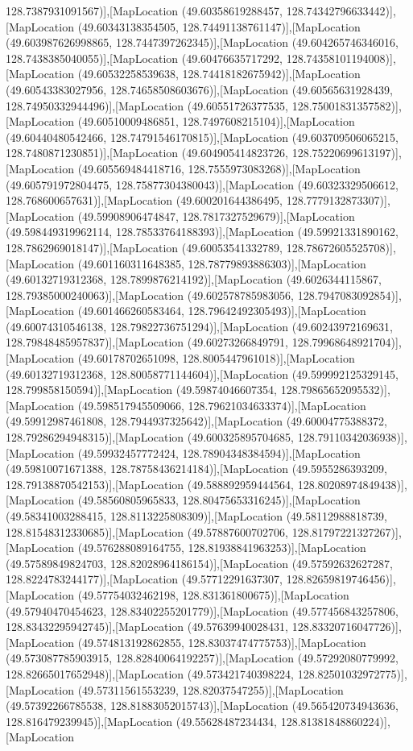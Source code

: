 128.7387931091567)],[MapLocation (49.60358619288457, 128.74342796633442)],[MapLocation (49.60343138354505, 128.74491138761147)],[MapLocation (49.603987626998865, 128.7447397262345)],[MapLocation (49.604265746346016, 128.7438385040055)],[MapLocation (49.60476635717292, 128.74358101194008)],[MapLocation (49.60532258539638, 128.74418182675942)],[MapLocation (49.60543383027956, 128.74658508603676)],[MapLocation (49.60565631928439, 128.74950332944496)],[MapLocation (49.60551726377535, 128.75001831357582)],[MapLocation (49.60510009486851, 128.7497608215104)],[MapLocation (49.60440480542466, 128.74791546170815)],[MapLocation (49.603709506065215, 128.7480871230851)],[MapLocation (49.604905414823726, 128.75220699613197)],[MapLocation (49.605569484418716, 128.7555973083268)],[MapLocation (49.605791972804475, 128.75877304380043)],[MapLocation (49.60323329506612, 128.768600657631)],[MapLocation (49.600201644386495, 128.7779132873307)],[MapLocation (49.59908906474847, 128.7817327529679)],[MapLocation (49.598449319962114, 128.78533764188393)],[MapLocation (49.59921331890162, 128.7862969018147)],[MapLocation (49.60053541332789, 128.78672605525708)],[MapLocation (49.601160311648385, 128.78779893886303)],[MapLocation (49.60132719312368, 128.7899876214192)],[MapLocation (49.6026344115867, 128.79385000240063)],[MapLocation (49.602578785983056, 128.7947083092854)],[MapLocation (49.601466260583464, 128.79642492305493)],[MapLocation (49.60074310546138, 128.79822736751294)],[MapLocation (49.60243972169631, 128.79848485957837)],[MapLocation (49.60273266849791, 128.79968648921704)],[MapLocation (49.60178702651098, 128.8005447961018)],[MapLocation (49.60132719312368, 128.80058771144604)],[MapLocation (49.599992125329145, 128.799858150594)],[MapLocation (49.59874046607354, 128.79865652095532)],[MapLocation (49.598517945509066, 128.79621034633374)],[MapLocation (49.59912987461808, 128.7944937325642)],[MapLocation (49.60004775388372, 128.79286294948315)],[MapLocation (49.600325895704685, 128.79110342036938)],[MapLocation (49.59932457772424, 128.78904348384594)],[MapLocation (49.59810071671388, 128.78758436214184)],[MapLocation (49.5955286393209, 128.79138870542153)],[MapLocation (49.588892959444564, 128.80208974849438)],[MapLocation (49.58560805965833, 128.80475653316245)],[MapLocation (49.58341003288415, 128.8113225808309)],[MapLocation (49.58112988818739, 128.81548312330685)],[MapLocation (49.57887600702706, 128.81797221327267)],[MapLocation (49.576288089164755, 128.81938841963253)],[MapLocation (49.57589849824703, 128.82028964186154)],[MapLocation (49.57592632627287, 128.8224783244177)],[MapLocation (49.57712291637307, 128.82659819746456)],[MapLocation (49.57754032462198, 128.831361800675)],[MapLocation (49.57940470454623, 128.83402255201779)],[MapLocation (49.577456843257806, 128.83432295942745)],[MapLocation (49.57639940028431, 128.83320716047726)],[MapLocation (49.574813192862855, 128.83037474775753)],[MapLocation (49.573087785903915, 128.82840064192257)],[MapLocation (49.57292080779992, 128.82665017652948)],[MapLocation (49.573421740398224, 128.82501032972775)],[MapLocation (49.57311561553239, 128.82037547255)],[MapLocation (49.57392266785538, 128.81883052015743)],[MapLocation (49.565420734943636, 128.816479239945)],[MapLocation (49.55628487234434, 128.81381848860224)],[MapLocation 